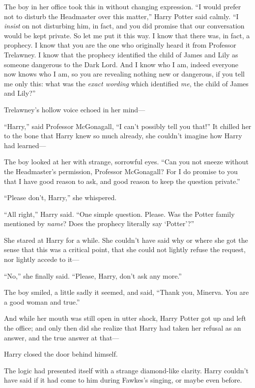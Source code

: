 The boy in her office took this in without changing expression.
“I would prefer not to disturb the Headmaster over this matter,” Harry Potter said calmly.
“I \emph{insist} on not disturbing him, in fact, and you did promise that our conversation would be kept private. So let me put it this way. I know that there was, in fact, a prophecy. I know that you are the one who originally heard it from Professor Trelawney. I know that the prophecy identified the child of James and Lily as someone dangerous to the Dark Lord. And I know who I am, indeed everyone now knows who I am, so you are revealing nothing new or dangerous, if you tell me only this: what was the \emph{exact wording} which identified \emph{me}, the child of James and Lily?”

Trelawney’s hollow voice echoed in her mind—


“Harry,” said Professor McGonagall,
“I can’t possibly tell you that!” It chilled her to the bone that Harry knew so much already, she couldn’t imagine how Harry had learned—

The boy looked at her with strange, sorrowful eyes.
“Can you not sneeze without the Headmaster’s permission, Professor McGonagall? For I do promise to you that I have good reason to ask, and good reason to keep the question private.”

“Please don’t, Harry,” she whispered.

“All right,” Harry said.
“One simple question. Please. Was the Potter family mentioned by \emph{name}? Does the prophecy literally say ‘Potter’?”

She stared at Harry for a while. She couldn’t have said why or where she got the sense that this was a critical point, that she could not lightly refuse the request, nor lightly accede to it—

“No,” she finally said.
“Please, Harry, don’t ask any more.”

The boy smiled, a little sadly it seemed, and said,
“Thank you, Minerva. You are a good woman and true.” %

And while her mouth was still open in utter shock, Harry Potter got up and left the office; and only then did she realize that Harry had taken her refusal as an answer, and the true answer at that—

Harry closed the door behind himself.

The logic had presented itself with a strange diamond-like clarity. Harry couldn’t have said if it had come to him during Fawkes’s singing, or maybe even before.

